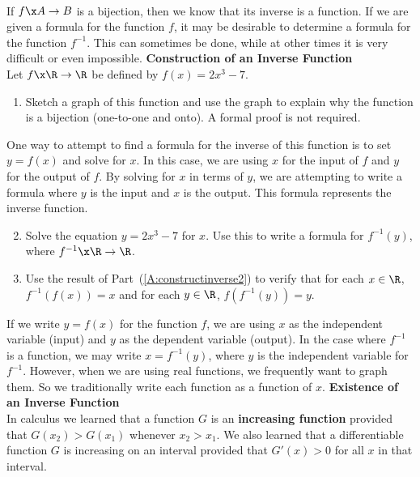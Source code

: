 %
%
%
\begin{activity}\label{A:constructinverse}\hfill \\
%
If $f\x A \to B$ is a bijection, then we know that its inverse is a function.  If  we are given a formula for the function  $f$, it may be desirable to determine a formula for the function  $f^{ - 1} $.  This can sometimes be done, while at other times it is very difficult or even impossible.
\vskip10pt
\noindent
\textbf{Construction of an Inverse Function} \\
Let  $f\x \R \to \R$ be defined by  $f( x ) = 2x^3  - 7$.

\begin{enumerate}
\item Sketch a graph of this function and use the graph to explain why the function is a bijection (one-to-one and onto).  A formal proof is not required.
\end{enumerate}

One way to attempt to find a formula for the inverse of this function is to set  
$y = f( x )$ and solve for  $x$.  In this case, we are using  $x$  for the input of  $f$  and  $y$  for the output of  $f$.  By solving for  $x$  in terms of  $y$, we are attempting to write a formula where   $y$  is the input and  $x$  is the output.  This formula represents the inverse function.

\begin{enumerate}
\setcounter{enumi}{1}
\item Solve the equation  $y = 2x^3  - 7$ for  $x$.  Use this to write a formula for  
$f^{ - 1} ( y )$, where  $f^{ - 1} \x \R \to \R$.  \label{A:constructinverse2}

\item Use the result of Part~(\ref{A:constructinverse2}) to verify that for each  
$x \in \R$,  $f^{ - 1} \!\left( {f( x )} \right) = x$ and for each  
$y \in \R$,  $f \!\left( {f^{ - 1} ( y )} \right) = y$.

\end{enumerate}

\noindent
\note  If we write  $y = f( x )$ for the function  $f$, we are using  $x$  as the independent variable (input) and  $y$  as the dependent variable (output).  In the case where  $f^{ - 1} $ is a function, we may write  $x = f^{ - 1} ( y )$, where  $y$  is the independent variable for  
$f^{ - 1} $.  However, when we are using real functions, we frequently want to graph them.  So we traditionally write each function as a function of  $x$.  
\vskip6pt
\noindent
\textbf{Existence of an Inverse Function} \\
In calculus we learned that a function  $G$  is an  \textbf{increasing function}
%
%
 provided that  
$G( {x_2 } ) > G( {x_1 } )$  whenever  $x_2  > x_1 $.  We also learned that a differentiable function  $G$  is increasing on an interval provided that  
$G'( x ) > 0$ for all  $x$  in that interval.


\end{activity}
